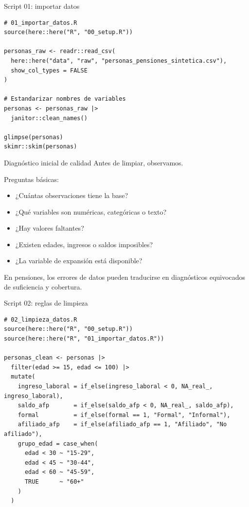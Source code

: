 \documentclass[aspectratio=169,11pt]{beamer}
\begin{document}
\begin{frame}[fragile]{Script 01: importar datos}
\begin{lstlisting}
# 01_importar_datos.R
source(here::here("R", "00_setup.R"))

personas_raw <- readr::read_csv(
  here::here("data", "raw", "personas_pensiones_sintetica.csv"),
  show_col_types = FALSE
)

# Estandarizar nombres de variables
personas <- personas_raw |>
  janitor::clean_names()

glimpse(personas)
skimr::skim(personas)
\end{lstlisting}
\end{frame}

\begin{frame}{Diagnóstico inicial de calidad}
Antes de limpiar, observamos.

\vspace{0.3cm}
Preguntas básicas:
\begin{itemize}
  \item ¿Cuántas observaciones tiene la base?
  \item ¿Qué variables son numéricas, categóricas o texto?
  \item ¿Hay valores faltantes?
  \item ¿Existen edades, ingresos o saldos imposibles?
  \item ¿La variable de expansión está disponible?
\end{itemize}

\vspace{0.2cm}
En pensiones, los errores de datos pueden traducirse en diagnósticos equivocados de suficiencia y cobertura.
\end{frame}

\begin{frame}[fragile]{Script 02: reglas de limpieza}
\begin{lstlisting}
# 02_limpieza_datos.R
source(here::here("R", "00_setup.R"))
source(here::here("R", "01_importar_datos.R"))

personas_clean <- personas |>
  filter(edad >= 15, edad <= 100) |>
  mutate(
    ingreso_laboral = if_else(ingreso_laboral < 0, NA_real_, ingreso_laboral),
    saldo_afp       = if_else(saldo_afp < 0, NA_real_, saldo_afp),
    formal          = if_else(formal == 1, "Formal", "Informal"),
    afiliado_afp    = if_else(afiliado_afp == 1, "Afiliado", "No afiliado"),
    grupo_edad = case_when(
      edad < 30 ~ "15-29",
      edad < 45 ~ "30-44",
      edad < 60 ~ "45-59",
      TRUE      ~ "60+"
    )
  )
\end{lstlisting}
\end{frame}
\end{document}
